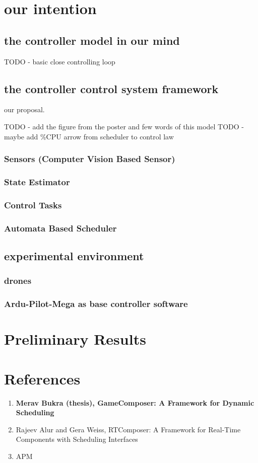 \documentclass[11pt]{article}
\begin{document}
\section{our intention}
\subsection{the controller model in our mind}
TODO - basic close controlling loop

\subsection{the controller control system framework}
our proposal.

TODO - add the figure from the poster and few words of this model
TODO - maybe add \%CPU arrow from scheduler to control law 

\subsubsection{Sensors (Computer Vision Based Sensor)}
\subsubsection{State Estimator}
\subsubsection{Control Tasks}
\subsubsection{Automata Based Scheduler}

\subsection{experimental environment}
\subsubsection{drones}
\subsubsection{Ardu-Pilot-Mega as base controller software}

\section{Preliminary Results}

\section{References}
\begin{enumerate}
\item \textbf{Merav Bukra (thesis), GameComposer: A Framework for Dynamic Scheduling}
\item Rajeev Alur and Gera Weiss, RTComposer: A Framework for Real-Time Components with Scheduling Interfaces
\item APM
\end{enumerate}
\end{document}
